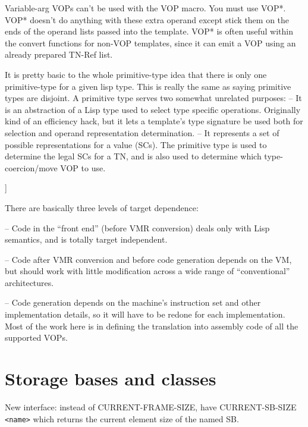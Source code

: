     Variable-arg VOPs can't be used with the VOP macro.  You must use VOP*.
    VOP* doesn't do anything with these extra operand except stick them on the
    ends of the operand lists passed into the template.  VOP* is often useful
    within the convert functions for non-VOP templates, since it can emit a VOP
    using an already prepared TN-Ref list.
    

    It is pretty basic to the whole primitive-type idea that there is only one
    primitive-type for a given lisp type.  This is really the same as saying
    primitive types are disjoint.  A primitive type serves two somewhat
    unrelated purposes:
     -- It is an abstraction of a Lisp type used to select type specific
        operations.  Originally kind of an efficiency hack, but it lets a
        template's type signature be used both for selection and operand
        representation determination.
     -- It represents a set of possible representations for a value (SCs).  The
        primitive type is used to determine the legal SCs for a TN, and is also
        used to determine which type-coercion/move VOP to use.

]

There are basically three levels of target dependence:

 -- Code in the ``front end'' (before VMR conversion) deals only with Lisp
    semantics, and is totally target independent.

 -- Code after VMR conversion and before code generation depends on the VM,
    but should work with little modification across a wide range of
    ``conventional'' architectures.

 -- Code generation depends on the machine's instruction set and other
    implementation details, so it will have to be redone for each
    implementation.  Most of the work here is in defining the translation into
    assembly code of all the supported VOPs.



\chapter{Storage bases and classes}
New interface: instead of CURRENT-FRAME-SIZE, have CURRENT-SB-SIZE \verb+<name>+ which
returns the current element size of the named SB.


